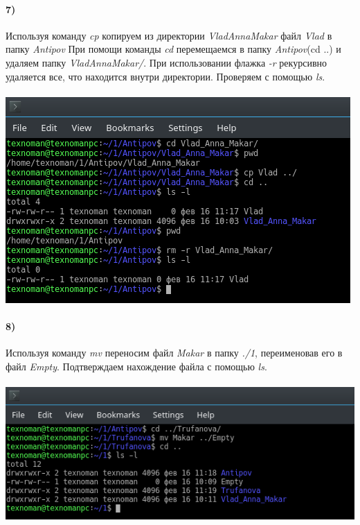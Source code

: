 	\paragraph{7)}
	Используя команду \textit{cp} копируем из директории \textit{VladAnnaMakar} файл \textit{Vlad} в папку \textit{Antipov}
	При помощи команды \textit{cd} перемещаемся в папку \textit{Antipov}(cd ..) и удаляем папку \textit{VladAnnaMakar/}. 
	При использовании флажка \textit{-r} рекурсивно удаляется все, что находится внутри директории. Проверяем с помощью 
	\textit{ls}.\\
	\\
	\includegraphics[width=\textwidth]{7.png}

	\paragraph{8)}
	Используя команду \textit{mv} переносим файл \textit{Makar} в папку \textit{./1}, переименовав его в файл \textit{Empty}.
	Подтверждаем нахождение файла с помощью \textit{ls}.\\
	\\
	\includegraphics[width=\textwidth]{8.png}

